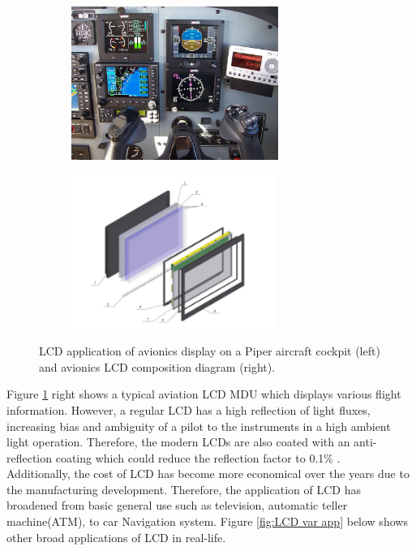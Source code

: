 \begin{figure}[!ht]
\Centering
%    
  \begin{subfigure}[b]{0.4\textwidth}
    \includegraphics[height=5cm]{Figures/LCD_Avionics_5inch.jpg}
  \end{subfigure}
  \begin{subfigure}[b]{0.35\textwidth}
    \includegraphics[height=5cm]{Figures/LCD_avionics_composition.PNG}
  \end{subfigure}
%  
  \caption{LCD application of avionics display on a Piper aircraft cockpit \cite{Anonymous5LCD} (left) and avionics LCD composition diagram \cite{Alimova2020MethodsApplications} (right).}
    \label{fig:avionics 5inc}
\end{figure}

\noindent Figure \ref{fig:avionics 5inc} right shows a typical aviation LCD MDU which displays various flight information. However, a regular LCD has a high reflection of light fluxes, increasing bias and ambiguity of a pilot to the instruments in a high ambient light operation. Therefore, the modern LCDs are also coated with an anti-reflection coating which could reduce the reflection factor to 0.1\% \cite{Livada2012AFVCriteria}.\\

\noindent Additionally, the cost of LCD has become more economical over the years due to the manufacturing development. Therefore, the application of LCD has broadened from basic general use such as television, automatic teller machine(ATM), to car Navigation system. Figure \ref{fig:LCD var app} below shows other broad applications of LCD in real-life.\\


